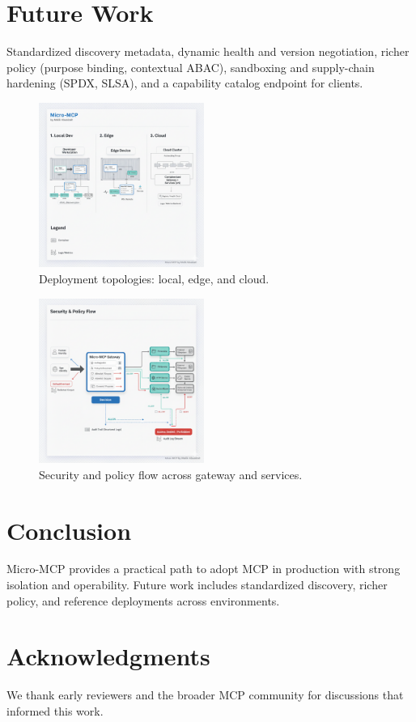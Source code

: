 \documentclass[conference]{IEEEtran}
\begin{document}
\section{Future Work}
Standardized discovery metadata, dynamic health and version negotiation, richer policy (purpose binding, contextual ABAC), sandboxing and supply-chain hardening (SPDX\cite{spdx}, SLSA\cite{slsa}), and a capability catalog endpoint for clients.

\begin{figure}[t]
  \centering
  \includegraphics[width=0.48\textwidth]{figures/deployment-topology-local-edge-cloud.png}
  \caption{Deployment topologies: local, edge, and cloud.}
  \label{fig:deploy}
\end{figure}

\begin{figure}[t]
  \centering
  \includegraphics[width=0.48\textwidth]{figures/security-and-policy-flow.png}
  \caption{Security and policy flow across gateway and services.}
  \label{fig:security}
\end{figure}

\section{Conclusion}
Micro-MCP provides a practical path to adopt MCP in production with strong isolation and operability. Future work includes standardized discovery, richer policy, and reference deployments across environments.

\section*{Acknowledgments}
We thank early reviewers and the broader MCP community for discussions that informed this work.



\end{document}
